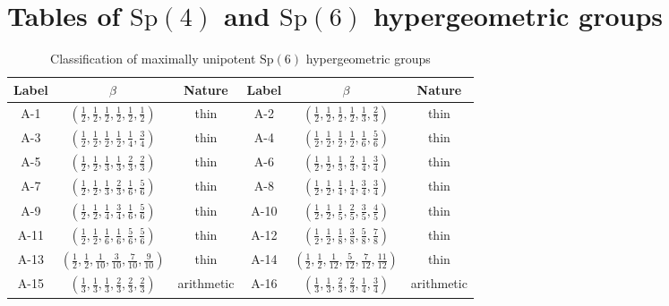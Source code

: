 \documentclass[11pt,a4paper]{amsart}
\theoremstyle{definition}
\theoremstyle{definition}
\numberwithin{equation}{section}
\newcommand{\Sp}{\mathrm{Sp}}
\begin{document}
\section{Tables of \texorpdfstring{$\Sp(4)$}{Sp(4)} and \texorpdfstring{$\Sp(6)$}{Sp(6)} hypergeometric groups}
{\centering %
\scriptsize\renewcommand{\arraystretch}{2}
\begin{longtable}{|c|c|c|||c|c|c|}
\caption{Classification of maximally unipotent $\Sp(6)$ hypergeometric groups}\label{tab:thin}\\
\hline
Label & $\beta$ & Nature & Label & $\beta$ & Nature \\
\hline
\hline
A-1 & $\left(\frac{1}{2},\frac{1}{2},\frac{1}{2},\frac{1}{2},\frac{1}{2},\frac{1}{2}\right)$ & thin &
A-2 & $\left(\frac{1}{2},\frac{1}{2},\frac{1}{2},\frac{1}{2},\frac{1}{3},\frac{2}{3}\right)$ & thin \\
\hline
A-3 & $\left(\frac{1}{2},\frac{1}{2},\frac{1}{2},\frac{1}{2},\frac{1}{4},\frac{3}{4}\right)$ & thin &
A-4 & $\left(\frac{1}{2},\frac{1}{2},\frac{1}{2},\frac{1}{2},\frac{1}{6},\frac{5}{6}\right)$ & thin \\
\hline
A-5 & $\left(\frac{1}{2},\frac{1}{2},\frac{1}{3},\frac{1}{3},\frac{2}{3},\frac{2}{3}\right)$ & thin &
A-6 & $\left(\frac{1}{2},\frac{1}{2},\frac{1}{3},\frac{2}{3},\frac{1}{4},\frac{3}{4}\right)$ & thin \\
\hline
A-7 & $\left(\frac{1}{2},\frac{1}{2},\frac{1}{3},\frac{2}{3},\frac{1}{6},\frac{5}{6}\right)$ & thin &
A-8 & $\left(\frac{1}{2},\frac{1}{2},\frac{1}{4},\frac{1}{4},\frac{3}{4},\frac{3}{4}\right)$ & thin \\
\hline
A-9 & $\left(\frac{1}{2},\frac{1}{2},\frac{1}{4},\frac{3}{4},\frac{1}{6},\frac{5}{6}\right)$ & thin &
A-10 & $\left(\frac{1}{2},\frac{1}{2},\frac{1}{5},\frac{2}{5},\frac{3}{5},\frac{4}{5}\right)$ & thin \\
\hline
A-11 & $\left(\frac{1}{2},\frac{1}{2},\frac{1}{6},\frac{1}{6},\frac{5}{6},\frac{5}{6}\right)$ & thin &
A-12 & $\left(\frac{1}{2},\frac{1}{2},\frac{1}{8},\frac{3}{8},\frac{5}{8},\frac{7}{8}\right)$ & thin \\
\hline
A-13 & $\left(\frac{1}{2},\frac{1}{2},\frac{1}{10},\frac{3}{10},\frac{7}{10},\frac{9}{10}\right)$ & thin &
A-14 & $\left(\frac{1}{2},\frac{1}{2},\frac{1}{12},\frac{5}{12},\frac{7}{12},\frac{11}{12}\right)$ & thin \\
\hline
A-15 & $\left(\frac{1}{3},\frac{1}{3},\frac{1}{3},\frac{2}{3},\frac{2}{3},\frac{2}{3}\right)$ & arithmetic \cite{BDN22} &
A-16 & $\left(\frac{1}{3},\frac{1}{3},\frac{2}{3},\frac{2}{3},\frac{1}{4},\frac{3}{4}\right)$ & arithmetic \cite{BDN22} \\

\end{longtable}}
\end{document}

